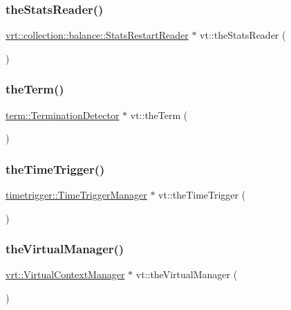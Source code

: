 \mbox{\label{namespacevt_ad73860100c7d2ca1d833eab74942ee73}} 
\subsubsection{\texorpdfstring{the\+Stats\+Reader()}{theStatsReader()}}
{\footnotesize\ttfamily \hyperlink{structvt_1_1vrt_1_1collection_1_1balance_1_1_stats_restart_reader}{vrt\+::collection\+::balance\+::\+Stats\+Restart\+Reader} $\ast$ vt\+::the\+Stats\+Reader (\begin{DoxyParamCaption}{ }\end{DoxyParamCaption})}

\mbox{\label{namespacevt_a127580fdfcaba0b4171e5c48c5676733}} 
\subsubsection{\texorpdfstring{the\+Term()}{theTerm()}}
{\footnotesize\ttfamily \hyperlink{structvt_1_1term_1_1_termination_detector}{term\+::\+Termination\+Detector} $\ast$ vt\+::the\+Term (\begin{DoxyParamCaption}{ }\end{DoxyParamCaption})}

\mbox{\label{namespacevt_a1e1a39cdf2a3fc1adefcdfcca4716bf2}} 
\subsubsection{\texorpdfstring{the\+Time\+Trigger()}{theTimeTrigger()}}
{\footnotesize\ttfamily \hyperlink{structvt_1_1timetrigger_1_1_time_trigger_manager}{timetrigger\+::\+Time\+Trigger\+Manager} $\ast$ vt\+::the\+Time\+Trigger (\begin{DoxyParamCaption}{ }\end{DoxyParamCaption})}

\mbox{\label{namespacevt_ad46b232b74b745991314a4a509c648f9}} 
\subsubsection{\texorpdfstring{the\+Virtual\+Manager()}{theVirtualManager()}}
{\footnotesize\ttfamily \hyperlink{structvt_1_1vrt_1_1_virtual_context_manager}{vrt\+::\+Virtual\+Context\+Manager} $\ast$ vt\+::the\+Virtual\+Manager (\begin{DoxyParamCaption}{ }\end{DoxyParamCaption})}

